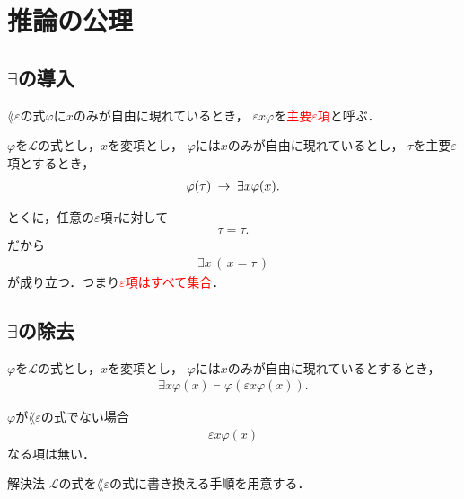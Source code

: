 \section{推論の公理}
\subsection{$\exists$の導入}
	$\lang{\varepsilon}$の式$\varphi$に$x$のみが自由に現れているとき，
	$\varepsilon x \varphi$を\textcolor{red}{主要$\varepsilon$項}と呼ぶ．
	
	\begin{screen}
		\begin{logicalaxm}
			$\varphi$を$\mathcal{L}$の式とし，$x$を変項とし，
			$\varphi$には$x$のみが自由に現れているとし，
			$\tau$を主要$\varepsilon$項とするとき，
			\begin{align}
				\varphi(\tau) \hspace{0.25em}\rightarrow\hspace{0.25em} \exists x \varphi(x).
			\end{align}
		\end{logicalaxm}
	\end{screen}
	
	とくに，任意の$\varepsilon$項$\tau$に対して
	\begin{align}
		\tau = \tau.
	\end{align}
	だから
	\begin{align}
		\exists x\, (\, x = \tau\, )
	\end{align}
	が成り立つ．つまり\textcolor{red}{$\varepsilon$項はすべて集合}．
	
\newpage
\subsection{$\exists$の除去}
	\begin{screen}
		\begin{logicalaxm}
			$\varphi$を$\mathcal{L}$の式とし，$x$を変項とし，
			$\varphi$には$x$のみが自由に現れているとするとき，
			\begin{align}
				\exists x \varphi(x) \vdash \varphi(\varepsilon x \varphi(x)).
			\end{align}
		\end{logicalaxm}
	\end{screen}
	
	$\varphi$が$\lang{\varepsilon}$の式でない場合
	\begin{align}
		\varepsilon x \varphi(x)
	\end{align}
	なる項は無い．
	
	\begin{itembox}[l]{解決法}
		$\mathcal{L}$の式を$\lang{\varepsilon}$の式に書き換える手順を用意する．
	\end{itembox}

